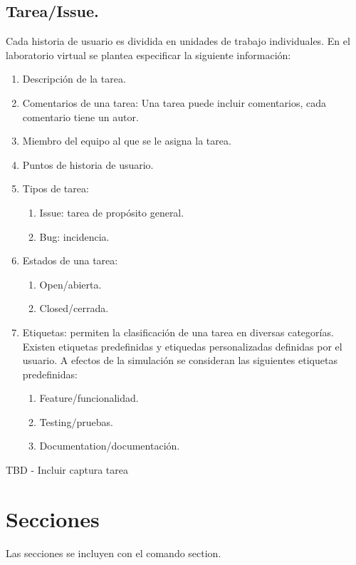 \subsection{Tarea/Issue.}

Cada historia de usuario es dividida en unidades de trabajo individuales. En el laboratorio virtual se plantea especificar la siguiente información:

\begin{enumerate}
	\item Descripción de la tarea.
	\item Comentarios de una tarea: Una tarea puede incluir comentarios, cada comentario tiene un autor.
	\item Miembro del equipo al que se le asigna la tarea.
	\item Puntos de historia de usuario.
	\item Tipos de tarea:
		\begin{enumerate}
			\item Issue: tarea de propósito general.
			\item Bug: incidencia.
		\end{enumerate}
	\item Estados de una tarea:
		\begin{enumerate}
			\item Open/abierta.
			\item Closed/cerrada.
		\end{enumerate}
	\item Etiquetas: permiten la clasificación de una tarea en diversas categorías. Existen etiquetas predefinidas y etiquedas personalizadas definidas por el usuario. A efectos de la simulación se consideran las siguientes etiquetas predefinidas:	
		\begin{enumerate}
			\item Feature/funcionalidad.
			\item Testing/pruebas.
			\item Documentation/documentación.
		\end{enumerate}
\end{enumerate}

TBD - Incluir captura tarea


\section{Secciones}

Las secciones se incluyen con el comando section.

